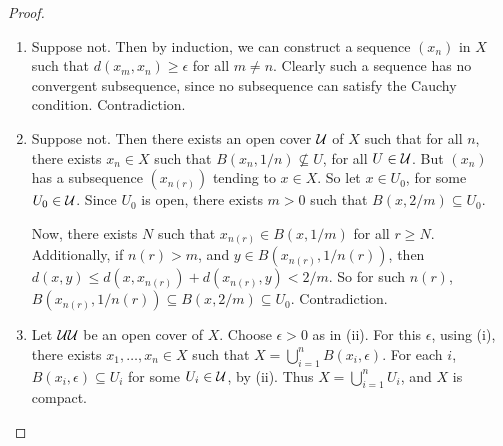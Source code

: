 \begin{proof}
\mbox{}
\begin{enumerate}
	\item Suppose not. Then by induction, we can construct a sequence $(x_n)$ in $X$ such that $d(x_m,x_n) \geq \epsilon$ for all $m\neq n$. Clearly such a sequence has no convergent subsequence, since no subsequence can satisfy the Cauchy condition. Contradiction.

	\item Suppose not. Then there exists an open cover $\cal{U}$ of $X$ such that for all $n$, there exists $x_n\in X$ such that $B(x_n,1/n) \not \subseteq U$, for all $U \in \cal{U}$. But $(x_n)$ has a subsequence $(x_{n(r)})$ tending to $x\in X$. So let $x\in U_0$, for some $U_0 \in \cal{U}$. Since $U_0$ is open, there exists $m>0$ such that $B(x,2/m) \subseteq U_0$.

	\begin{center}
	\end{center}

	Now, there exists $N$ such that $x_{n(r)} \in B(x,1/m)$ for all $r\geq N$. Additionally, if $n(r)>m$, and $y\in B(x_{n(r)},1/n(r))$, then $d(x,y) \leq d(x,x_{n(r)}) + d(x_{n(r)},y) < 2/m$. So for such $n(r)$, $B(x_{n(r)}, 1/n(r)) \subseteq B(x,2/m) \subseteq U_0$. Contradiction.
	
	\item Let $\cal{U}{U}$ be an open cover of $X$. Choose $\epsilon>0$ as in (ii). For this $\epsilon$, using (i), there exists $x_1,\ldots,x_n \in X$ such that $X=\bigcup_{i=1}^n B(x_i,\epsilon)$. For each $i$, $B(x_i,\epsilon) \subseteq U_i$ for some $U_i \in \cal{U}$, by (ii). Thus $X=\bigcup_{i=1}^n U_i$, and $X$ is compact. \qedhere
\end{enumerate}
\end{proof}

